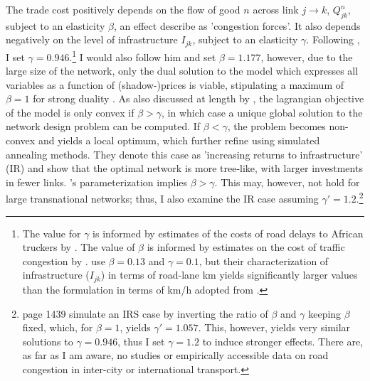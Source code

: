 \documentclass[a4paper]{article}
\begin{document}
The trade cost positively depends on the flow of good $n$ across link $j\to k$, $Q^n_{jk}$, subject to an elasticity $\beta$, an effect \citet{fajgelbaum2020optimal} describe as 'congestion forces'. It also depends negatively on the level of infrastructure $I_{jk}$, subject to an elasticity $\gamma$. Following \citet{graff2019spatial}, I set $\gamma = 0.946$.\footnote{The value for $\gamma$ is informed by estimates of the costs of road delays to African truckers by \citet{teravaninthorn2009transport}. The value of $\beta$ is informed by estimates on the cost of traffic congestion by \citet{wang2011logistic}. \citet{fajgelbaum2020optimal} use $\beta = 0.13$ and $\gamma = 0.1$, but their characterization of infrastructure ($I_{jk}$) in terms of road-lane km yields significantly larger values than the formulation in terms of km/h adopted from \citet{graff2019spatial}.} I would also follow him and set $\beta = 1.177$, however, due to the large size of the network, only the dual solution to the model which expresses all variables as a function of (shadow-)prices is viable, stipulating a maximum of $\beta = 1$ for strong duality \citep{fajgelbaum2020optimal}. As also discussed at length by \citet{fajgelbaum2020optimal}, the lagrangian objective of the model is only convex if $\beta > \gamma$, in which case a unique global solution to the network design problem can be computed. If $\beta < \gamma$, the problem becomes non-convex and yields a local optimum, which \citet{fajgelbaum2020optimal} further refine using simulated annealing methods. They denote this case as 'increasing returns to infrastructure' (IR) and show that the optimal network is more tree-like, with larger investments in fewer links. \citet{graff2019spatial}'s parameterization implies $\beta > \gamma$. This may, however, not hold for large transnational networks; thus, I also examine the IR case assuming $\gamma' = 1.2$.\footnote{\citet{fajgelbaum2020optimal} page 1439 simulate an IRS case by inverting the ratio of $\beta$ and $\gamma$ keeping $\beta$ fixed, which, for $\beta = 1$, yields $\gamma' = 1.057$. This, however, yields very similar solutions to $\gamma = 0.946$, thus I set $\gamma = 1.2$ to induce stronger effects. There are, as far as I am aware, no studies or empirically accessible data on road congestion in inter-city or international transport.} \newline  
\end{document}
